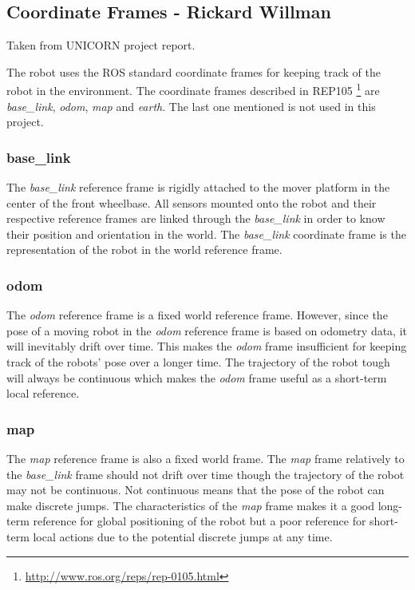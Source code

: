 \subsection{Coordinate Frames - Rickard Willman}
Taken from UNICORN project report.
\medskip

\noindent
The robot uses the ROS standard coordinate frames for keeping track of the robot in the environment. The coordinate frames described in REP105 \footnote{\url{http://www.ros.org/reps/rep-0105.html}} are \textit{base\_link}, \textit{odom}, \textit{map} and \textit{earth}. The last one mentioned is not used in this project.

\subsubsection{base\_link}
The \textit{base\_link} reference frame is rigidly attached to the mover platform in the center of the front wheelbase. All sensors  mounted onto the robot and their respective reference frames are linked through the \textit{base\_link} in order to know their position and orientation in the world. The \textit{base\_link} coordinate frame is the representation of the robot in the world reference frame.

\subsubsection{odom}
The \textit{odom} reference frame is a fixed world reference frame. However, since the pose of a moving robot in the \textit{odom} reference frame is based on odometry data, it will inevitably drift over time. This makes the \textit{odom} frame insufficient for keeping track of the robots' pose over a longer time. The trajectory of the robot tough will always be continuous which makes the \textit{odom} frame useful as a short-term local reference.

\subsubsection{map}
The \textit{map} reference frame is also a fixed world frame. The \textit{map} frame relatively to the \textit{base\_link} frame should not drift over time though the trajectory of the robot may not be continuous. Not continuous means that the pose of the robot can make discrete jumps. The characteristics of the \textit{map} frame makes it a good long-term reference for global positioning of the robot but a poor reference for short-term local actions due to the potential discrete jumps at any time.